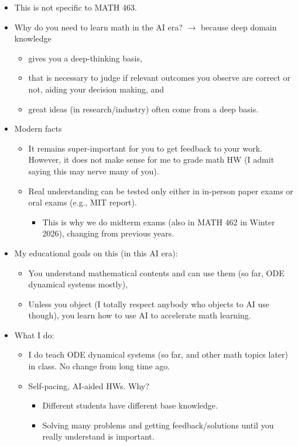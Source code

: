 \documentclass[20pt]{extarticle}
\begin{document}
\begin{itemize}
\item This is not specific to MATH 463.
\item Why do you need to learn math in the AI era? $\to$ because deep domain knowledge
	\begin{itemize}
	\item gives you a deep-thinking basis,
	\item that is necessary to judge if relevant outcomes you observe are correct or not, aiding your decision making, and
	\item great ideas (in research/industry) often come from a deep basis.
	\end{itemize}
\item Modern facts
	\begin{itemize}
	\item It remains super-important for you to get feedback to your work. However, it does not make sense for me to grade math HW (I admit saying this may nerve many of you).
	\item Real understanding can be tested only either in in-person paper exams or oral exams (e.g., MIT report).
		\begin{itemize}
		\item This is why we do midterm exams (also in MATH 462 in Winter 2026), changing from previous years.
		\end{itemize}
	\end{itemize}
\item My educational goals on this (in this AI era):
	\begin{itemize}
	\item You understand mathematical contents and can use them (so far, ODE dynamical systems mostly),
	\item Unless you object (I totally respect anybody who objects to AI use though), you learn how to use AI to accelerate math learning.
	\end{itemize}
\item What I do:
	 \begin{itemize}
	 \item I do teach ODE dynamical systems (so far, and other math topics later) in class. No change from long time ago.
	 \item Self-pacing, AI-aided HWs. Why?
	 	\begin{itemize}
		\item Different students have different base knowledge.
		\item Solving many problems and getting feedback/solutions until you really understand is important.
		\end{itemize}
	\end{itemize}
\end{itemize}
	
\end{document}
